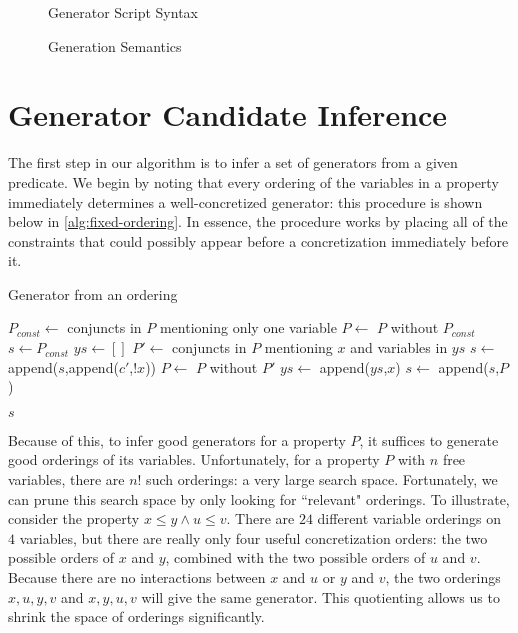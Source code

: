 \documentclass[10pt,a4paper]{article}
\newtheorem{definition}{Definition}
\begin{document}

\begin{figure}
\caption{Generator Script Syntax}
\label{fig:aluck-syntax}
\end{figure}

\begin{figure}
\caption{Generation Semantics}
\label{fig:aluck-semantics}
\end{figure}

\section{Generator Candidate Inference}
\label{sec:sci}
The first step in our algorithm is to infer a set of generators from a given predicate. We begin by noting that every ordering of the variables in a property immediately determines a well-concretized generator: this procedure is shown below in \autoref{alg:fixed-ordering}. In essence, the procedure works by placing all of the constraints that could possibly appear before a concretization immediately before it.

\begin{algorithm}
    \caption{Generator from an ordering}
    \label{alg:fixed-ordering}
    \begin{algorithmic}
       \State $P_{const} \gets$ conjuncts in $P$ mentioning only one variable
       \State $P \gets$ $P$ without $P_{const}$
       \State $s \gets P_{const}$ 
       \State $ys \gets []$ 
         \State $P' \gets$ conjuncts in $P$ mentioning $x$ and variables in $ys$
         \State $s \gets$ append($s$,append($c'$,$!x$))
         \State $P \gets$ $P$ without $P'$
         \State $ys \gets$ append($ys$,$x$)
       \EndFor
       \State $s \gets$ append($s$,$P$)
       
       \Return $s$
      \EndFunction
    \end{algorithmic}
\end{algorithm}


Because of this, to infer good generators for a property $P$, it suffices to generate good orderings of its variables. Unfortunately, for a property $P$ with $n$ free variables, there are $n!$ such orderings: a very large search space. Fortunately, we can prune this search space by only looking for ``relevant" orderings. To illustrate, consider the property $x \leq y \wedge u \leq v$. There are $24$ different variable orderings on $4$ variables, but there are really only four useful concretization orders: the two possible orders of $x$ and $y$, combined with the two possible orders of $u$ and $v$. Because there are no interactions between $x$ and $u$ or $y$ and $v$, the two orderings $x,u,y,v$ and $x,y,u,v$ will give the same generator. This quotienting allows us to shrink the space of orderings significantly.
\end{document}
